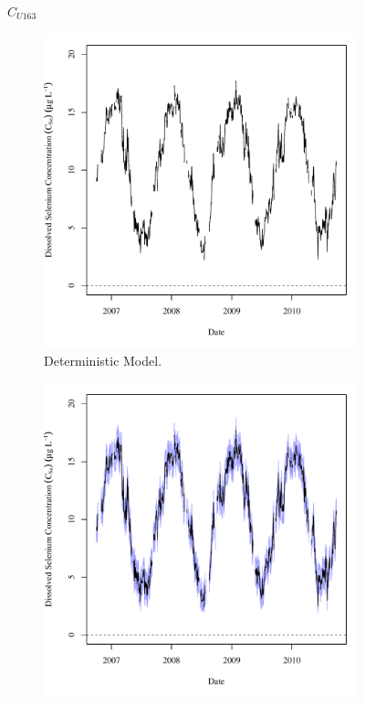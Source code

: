 \subfiguretop
\begin{landscape}
	\begin{figure}
		$ C_{U163} $
		\begin{subfigure}{0.7\textwidth}
			\centering
			\includegraphics[width=\tableCustomSize]{"Figures/Results_USR/Deterministic/c TS U163"}
			\caption{Deterministic Model.}
		\end{subfigure}%
		\begin{subfigure}{0.7\textwidth}
			\centering
			\includegraphics[width=\tableCustomSize]{"Figures/Results_USR/Stochastic/c TS U163"}

\end{subfigure}
\end{figure}
\end{landscape}
